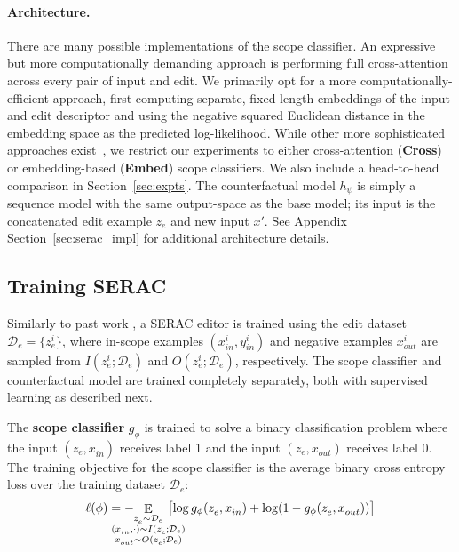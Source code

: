 \documentclass{article}
\newcommand{\cls}{g_\phi}
\newcommand{\rep}{h_\psi}
\newcommand{\name}{SERAC}
\newcommand{\editdata}{\mathcal{D}_{e}}
\newcommand{\ze}[1][]{z_e^{#1}}
\newcommand{\xloc}[1][]{x_{out}^{#1}}
\newcommand{\xtest}[1][]{x_{in}^{#1}}
\newcommand{\ytest}[1][]{y_{in}^{#1}}
\newcommand{\xunk}[1][]{x'}
\DeclareMathOperator*{\E}{\mathbb{E}}
\begin{document}


\paragraph{Architecture.} There are many possible implementations of the scope classifier. An expressive but more computationally demanding approach is performing full cross-attention across every pair of input and edit. We primarily opt for a more computationally-efficient approach, first computing separate, fixed-length embeddings of the input and edit descriptor \citep[as in][]{karpukhin-etal-2020-dense} and using the negative squared Euclidean distance in the embedding space as the predicted log-likelihood. While other more sophisticated approaches exist~\citep{khattab2020colbert,santhanam2021colbert}, we restrict our experiments to either cross-attention (\textbf{Cross}) or embedding-based (\textbf{Embed}) scope classifiers. We also include a head-to-head comparison in Section~\ref{sec:expts}. The counterfactual model $\rep$ is simply a sequence model with the same output-space as the base model; its input is the concatenated edit example $\ze$ and new input $\xunk$. See Appendix Section~\ref{sec:serac_impl} for additional architecture details.

\subsection{Training {\name}}
\label{sec:editortraining}
Similarly to past work \citep{Cao2021EditingFK,mitchell2021fast,hase2021language}, a {\name} editor is trained using the edit dataset $\editdata =\{\ze[i]\}$, where in-scope examples $(\xtest[i], \ytest[i])$ and negative examples $\xloc[i]$ are sampled from $I(\ze[i]; \editdata)$ and $O(\ze[i]; \editdata)$, respectively. The scope classifier and counterfactual model are trained completely separately, both with supervised learning as described next.

The \textbf{scope classifier} $\cls$ is trained to solve a binary classification problem where the input $(\ze, \xtest)$ receives label 1 and the input $(\ze, \xloc)$ receives label 0. The training objective for the scope classifier is the average binary cross entropy loss over the training dataset $\editdata$:
\begin{equation}
\ell(\phi) = - \hspace{-7mm} \E_{\substack{\ze \sim \editdata\\
(\xtest, \cdot) \sim I(\ze; \editdata)\\ 
\xloc \sim O(\ze; \editdata)}}
\hspace{-5mm} \bigl[
\log \cls(\ze, \xtest) + \log (1-\cls(\ze, \xloc))
\bigr]
\end{equation}
\end{document}
